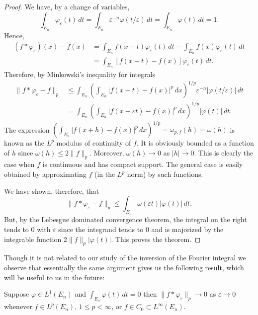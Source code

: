 \begin{proof}
We have, by a change of variables,
\[
\int_{E_{n}}\varphi_{\varepsilon}(t)\,dt
=\int_{E_{n}}\varepsilon^{-n}\varphi(t/\varepsilon)\,dt
=\int_{E_{n}}\varphi(t)\,dt=1.
\]
Hence,
\begin{align*}
(f*\varphi_{\varepsilon})(x)-f(x)
&=\int_{E_{n}}f(x-t)\varphi_{\varepsilon}(t)\,dt-\int_{E_{n}}f(x)\varphi_{\varepsilon}(t)\,dt\\
&=\int_{E_{n}}[f(x-t)-f(x)]\varphi_{\varepsilon}(t)\,dt.
\end{align*}
Therefore, by Minkowski's inequality for integrals
\begin{align*}
\|f*\varphi_{\varepsilon}-f\|_{p}
&\leq\int_{E_{n}}\left(\int_{E_{n}}|f(x-t)-f(x)|^{p}\,dx\right)^{1/p}\varepsilon^{-n}|\varphi(t/\varepsilon)|\,dt\\
&=\int_{E_{n}}\left(\int_{E_{n}}|f(x-\varepsilon t)-f(x)|^{p}\,dx\right)^{1/p}|\varphi(t)|\,dt.
\end{align*}
The expression
$(\int_{E_{n}}|f(x+h)-f(x)|^{p}\,dx)^{1/p}=\omega_{p,f}(h)=\omega(h)$ is known
as the $L^{p}$ modulus of continuity of $f$. It is obviously bounded as a
function of $h$ since $\omega(h)\leq2\|f\|_{p}$. Moreover, $\omega(h)\to0$ as
$|h|\to0$. This is clearly the case when $f$ is continuous and has compact
support. The general case is easily obtained by approximating $f$ (in the
$L^{p}$ norm) by such functions.

We have shown, therefore, that
\[
\|f*\varphi_{\varepsilon}-f\|_{p}\leq\int_{E_{n}}\omega(\varepsilon t)|\varphi(t)|\,dt.
\]
But, by the Lebesgue dominated convergence theorem, the integral on the right
tends to $0$ with $\varepsilon$ since the integrand tends to $0$ and is
majorized by the integrable function $2\|f\|_{p}|\varphi(t)|$. This proves the
theorem.
\end{proof}

Though it is not related to our study of the inversion of the Fourier integral
we observe that essentially the same argument gives us the following result,
which will be useful to us in the future:

\begin{corollary}\label{cor:c1-1-19}
Suppose $\varphi \in L^{1}(E_{n})$ and $\int_{E_{n}} \varphi(t) \, dt = 0$ then
$\|f * \varphi_{\varepsilon}\|_{p} \to 0$ as $\varepsilon \to 0$ whenever
$f \in L^{p}(E_{n})$, $1 \leq p < \infty$, or
$f \in C_{0} \subset L^{\infty}(E_{n})$.
\end{corollary}

